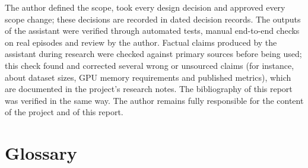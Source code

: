 \documentclass[ENG]{TFUOC}
\begin{document}
The author defined the scope, took every design decision and approved every scope change; these decisions are recorded in dated decision records. The outputs of the assistant were verified through automated tests, manual end-to-end checks on real episodes and review by the author. Factual claims produced by the assistant during research were checked against primary sources before being used; this check found and corrected several wrong or unsourced claims (for instance, about dataset sizes, GPU memory requirements and published metrics), which are documented in the project's research notes. The bibliography of this report was verified in the same way. The author remains fully responsible for the content of the project and of this report.












\chapter*{Glossary}
\end{document}
